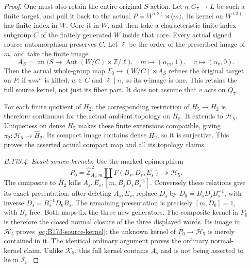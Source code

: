 \begin{proof}
One must also retain the entire original \(S\)-action.
Let \(\eta:G_7\to L\) be such a finite target, and pull it back to
the actual \(P=W^{(2)}\rtimes\langle m\rangle\).
Its kernel on \(W^{(2)}\) has finite index in \(W\).
Core it in \(W\), and then take a characteristic finite-index subgroup
\(C\) of the finitely generated \(W\) inside that core.
Every actual signed source automorphism preserves \(C\).
Let \(\ell\) be the order of the prescribed image of \(m\), and take
the finite image
\[
 A_S=\operatorname{im}\bigl(
 S\to\operatorname{Aut}(W/C)\times\mathbb Z/\ell\bigr),
 \quad m\mapsto(\overline\alpha_m,1),\quad
 v\mapsto(\overline\alpha_v,0).
\]
Then the actual whole-group map
\(\Gamma_0\to(W/C)\rtimes A_S\) refines the original target on \(P\):
if \(wm^n\) is killed, \(w\in C\) and \(\ell\mid n\), so its
\(\eta\)-image is one. This retains the full source kernel, not
just its fiber part. It does not assume that \(v\) acts on \(Q_7\).

For each finite quotient of \(H_2\), the corresponding restriction
of \(H_5\to H_2\) is therefore continuous for the actual ambient
topology on \(H_5\). It extends to \(\mathcal H_5\).
Uniqueness on dense \(H_5\) makes these finite extensions compatible,
giving \(\pi_2:\mathcal H_5\to\widehat H_2\).
Its compact image contains dense \(H_2\), so it is surjective.
This proves the asserted actual compact map and all its topology claims.

\emph{B.173.4. Exact source kernels.}
Use the marked epimorphism
\[
 P_0=\widehat{\mathbb Z}_{A_s,m}^{\,2}
                 \amalg\widehat F(B_s,D_s,E_s)
          \twoheadrightarrow\mathcal H_5.
\]
The composite to \(\widehat H_2\) kills
\(A_s,E_s,[m,B_sD_sB_s^{-1}]\).
Conversely these relations give its exact presentation: after deleting
\(A_s,E_s\), replace \(D_s\) by
\(D_0=B_sD_sB_s^{-1}\), with inverse
\(D_s=B_s^{-1}D_0B_s\). The remaining presentation is precisely
\([m,D_0]=1\), with \(B_s\) free. Both maps fix the three new generators.
The composite kernel in \(P_0\) is therefore the closed normal closure
of the three displayed words. Its image in \(\mathcal H_5\) proves
\eqref{eq:B173-source-kernel}; the unknown kernel of
\(P_0\to\mathcal H_5\) is merely contained in it.
The identical ordinary argument proves the ordinary normal-kernel claim.
Unlike \(\mathcal K_5\), this full kernel contains \(A_s\) and is not
being asserted to lie in \(\mathcal I_5\).


\end{proof}
